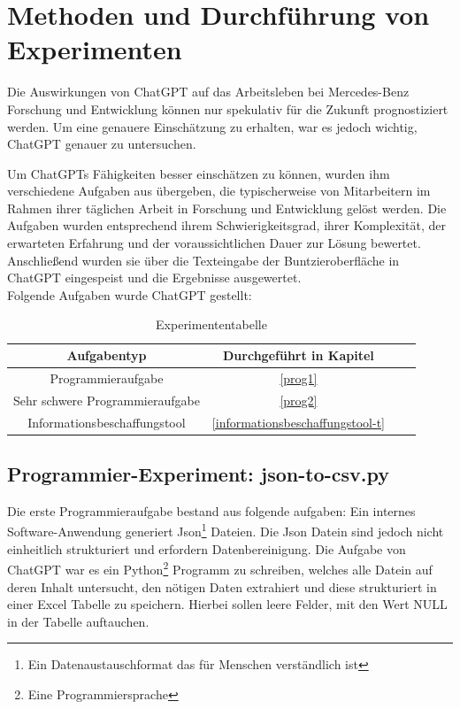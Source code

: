 \chapter{Methoden und Durchführung von Experimenten}\label{sec:Methoden und Durchführung von Experimenten}
Die Auswirkungen von ChatGPT auf das Arbeitsleben bei Mercedes-Benz Forschung und Entwicklung können nur spekulativ für die Zukunft prognostiziert werden. Um eine genauere Einschätzung zu erhalten, war es jedoch wichtig, ChatGPT genauer zu untersuchen.

Um ChatGPTs Fähigkeiten besser einschätzen zu können, wurden ihm verschiedene Aufgaben aus übergeben, die typischerweise von Mitarbeitern im Rahmen ihrer täglichen Arbeit in Forschung und Entwicklung gelöst werden. Die Aufgaben wurden entsprechend ihrem Schwierigkeitsgrad, ihrer Komplexität, der erwarteten Erfahrung und der voraussichtlichen Dauer zur Lösung bewertet. Anschließend wurden sie über die Texteingabe der Buntzieroberfläche in  ChatGPT eingespeist und die Ergebnisse ausgewertet. \\

Folgende Aufgaben wurde ChatGPT gestellt:


\begin{table}[h]
\centering
\begin{tabular}{|c|c|c|c|}
\hline
\textbf{Aufgabentyp} & \textbf{Durchgeführt in Kapitel}  \\ \hline
Programmieraufgabe & \autoref{prog1}  \\ \hline
Sehr schwere Programmieraufgabe & \autoref{prog2} \\ \hline
Informationsbeschaffungstool & \autoref{informationsbeschaffungstool-t}\\ \hline
\end{tabular}
\caption{Experimententabelle}
\label{tab:beispiel}
\end{table}


\section{Programmier-Experiment: json-to-csv.py}
\label{prog1}
Die erste Programmieraufgabe bestand aus folgende aufgaben:
Ein internes Software-Anwendung generiert Json\footnote{Ein Datenaustauschformat das für Menschen verständlich ist} Dateien. Die Json Datein sind jedoch nicht einheitlich strukturiert und erfordern Datenbereinigung. Die Aufgabe von ChatGPT war es ein Python\footnote{Eine Programmiersprache} Programm zu schreiben, welches alle Datein auf deren Inhalt untersucht, den nötigen Daten extrahiert und diese strukturiert in einer Excel Tabelle zu speichern. Hierbei sollen leere Felder, mit den Wert NULL in der Tabelle auftauchen.


